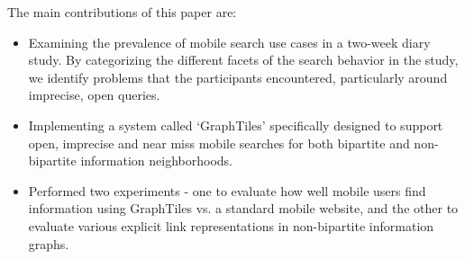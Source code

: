 The main contributions of this paper are:
\begin{itemize}
\item Examining the prevalence of mobile search use cases in a two-week diary study. By categorizing the different facets of the search behavior in the study, we identify problems that the participants encountered, particularly around imprecise, open queries. 
\item Implementing a system called `GraphTiles' specifically designed to support open, imprecise and near miss mobile searches for both bipartite and non-bipartite information neighborhoods.
\item Performed two experiments - one to evaluate how well mobile users find information using GraphTiles vs. a standard mobile website, and the other to evaluate various explicit link representations in non-bipartite information graphs.
\end{itemize}


